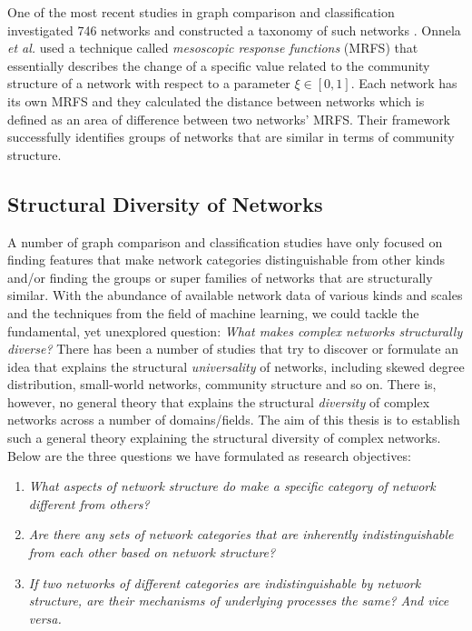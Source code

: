 \documentclass{article}
\begin{document}
	One of the most recent studies in graph comparison and classification investigated 746 networks and constructed a taxonomy of such networks \cite{Onnela_Taxonomy}.  Onnela \textit{et al.} used a technique called \textit{mesoscopic response functions} (MRFS) that essentially describes the change of a specific value related to the community structure of a network with respect to a parameter $\xi \in [0,1]$. Each network has its own MRFS and they calculated the distance between networks which is defined as an area of difference between two networks' MRFS. Their framework successfully identifies groups of networks that are similar in terms of community structure.

	
	
	\subsection{Structural Diversity of Networks}
	A number of graph comparison and classification studies have only focused on finding features that make network categories distinguishable from other kinds and/or finding the groups or super families of networks that are structurally similar. With the abundance of available network data of various kinds and scales and the techniques from the field of machine learning, we could tackle the fundamental, yet unexplored question: \textit{What makes complex networks structurally diverse?} There has been a number of studies that try to discover or formulate an idea that explains the structural \textit{universality} of networks, including skewed degree distribution, small-world networks, community structure and so on. There is, however, no general theory that explains the structural \textit{diversity} of complex networks across a number of domains/fields. The aim of  this thesis is to establish such a general theory explaining the structural diversity of complex networks. Below are the three  questions we have formulated as research objectives:

\begin{enumerate}
	\item \textit{What aspects of network structure do make a specific category of network different from others?}
	\item \textit{Are there any sets of network categories that are inherently indistinguishable from each other based on network structure?} 
	\item \textit{If two networks of different categories are indistinguishable by network structure, are their mechanisms of underlying processes the same? And vice versa.}
\end{enumerate}
\end{document}
